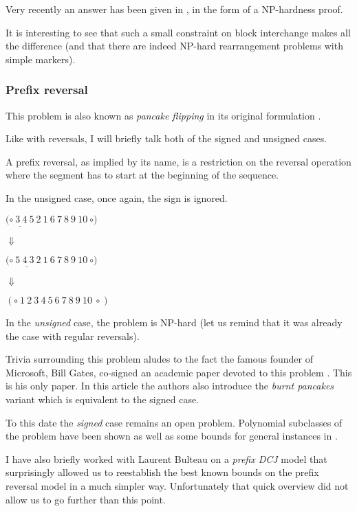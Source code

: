 \documentclass[11pt,final,twoside,nofrench]{thlifl}
\begin{document}
Very recently an answer has been given in \cite{B10}, in the form of a NP-hardness proof.

It is interesting to see that such a small constraint on block interchange makes all the difference (and that there are indeed NP-hard rearrangement problems with simple markers).

\subsubsection*{Prefix reversal}

This problem is also known as \emph{pancake flipping} in its original formulation \cite{D75}.

Like with reversals, I will briefly talk both of the signed and unsigned cases.

A prefix reversal, as implied by its name, is a restriction on the reversal operation where the segment has to start at the beginning of the sequence.

In the unsigned case, once again, the sign is ignored.

\begin{center}

$\underline{(\circ~3~4~5}~2~1~6~7~8~9~10~\circ)$

$\Downarrow$

$\underline{(\circ~5~4~3~2~1}~6~7~8~9~10~\circ)$

$\Downarrow$

$(\circ~1~2~3~4~5~6~7~8~9~10~\circ)$

\end{center}

In the \emph{unsigned} case, the problem is NP-hard \cite{B12} (let us remind that it was already the case with regular reversals).

Trivia surrounding this problem aludes to the fact the famous founder of Microsoft, Bill Gates, co-signed an academic paper devoted to this problem \cite{GP79}. This is his only paper. In this article the authors also introduce the \emph{burnt pancakes} variant which is equivalent to the signed case.

To this date the \emph{signed} case remains an open problem. Polynomial subclasses of the problem have been shown as well as some bounds for general instances in \cite{L11}.

I have also briefly worked with Laurent Bulteau on a \emph{prefix DCJ} model that surprisingly allowed us to reestablish the best known bounds on the prefix reversal model in a much simpler way. Unfortunately that quick overview did not allow us to go further than this point.
\end{document}
